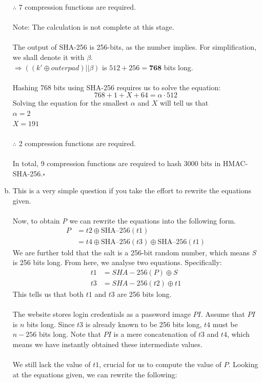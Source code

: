 \documentclass[12pt]{article}
\newcommand{\EOQ}{\hfill $\square$}
\begin{document}
\begin{enumerate}[(a)]
$\therefore$ 7 compression functions are required.\\\\\text{*}Note: The calculation is not complete at this stage.\\\\The output of SHA-256 is 256-bits, as the number implies. For simplification, we shall denote it with $\beta$.\\
$\Rightarrow ((k'\oplus outerpad)|| \beta)$ is $512+256=\textbf{768}$ bits long.\\\\
Hashing 768 bits using SHA-256 requires us to solve the equation:
\begin{equation*}
768+1+X+64=\alpha\cdot 512
\end{equation*}
Solving the equation for the smallest $\alpha$ and $X$ will tell us that
\\$\alpha=2$\\$X=191$\\\\
$\therefore$ 2 compression functions are required.\\\\In total, 9 compression functions are required to hash 3000 bits in HMAC-SHA-256.\EOQ
\item This is a very simple question if you take the effort to rewrite the equations given.\\\\Now, to obtain \textit{P} we can rewrite the equations into the following form.
\begin{equation*}
\begin{split}
P&=t2\oplus \text{SHA--}256(t1)\\
&=t4\oplus \text{SHA--}256(t3)\oplus \text{SHA--}256(t1)
\end{split}
\end{equation*}
We are further told that the salt is a 256-bit random number, which means \textit{S} is 256 bits long. From here, we analyse two equations. Specifically:
\begin{equation*}
\begin{split}
t1&=SHA-256(P)\oplus S\\
t3&=SHA-256(t2)\oplus t1
\end{split}
\end{equation*}
This tells us that both $t1$ and $t3$ are 256 bits long.\\\\The website stores login credentials as a password image $PI$. Assume that $PI$ is $n$ bits long. Since $t3$ is already known to be 256 bits long, $t4$ must be $n-256$ bits long. Note that $PI$ is a mere concatenation of $t3$ and $t4$, which means we have instantly obtained these intermediate values.\\\\We still lack the value of $t1$, crucial for us to compute the value of $P$. Looking at the equations given, we can rewrite the following:

\end{enumerate}
\end{document}
